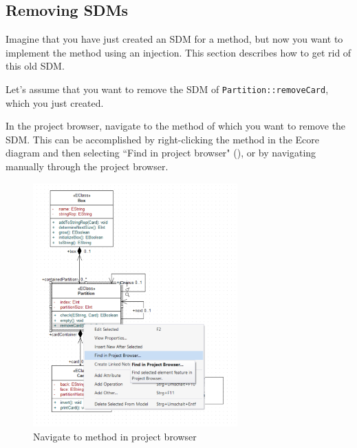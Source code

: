 \subsection*{Removing SDMs}

Imagine that you have just created an SDM for a method, but now you want to implement the method using an injection.
This section describes how to get rid of this old SDM.

Let's assume that you want to remove the SDM of \texttt{Partition::removeCard}, which you just created.

\begin{stepbystep}
\item
In the project browser, navigate to the method of which you want to remove the SDM.
This can be accomplished by right-clicking the method in the Ecore diagram and then selecting ``Find in project browser" (), or by navigating manually through the project browser.

\begin{figure}[htbp]
    \begin{center}
        \includegraphics[width=0.7\textwidth]{../../org.moflon.doc.handbook.03_storyDiagrams/03_removeCard/visRemImages/ea_sdmRemoveSDM_findInProjectBrowser}
        \caption{Navigate to method in project browser}  
        \label{ea:sdm_removeSDM_findInProjectBrowser}
    \end{center}
\end{figure}


\end{stepbystep}
